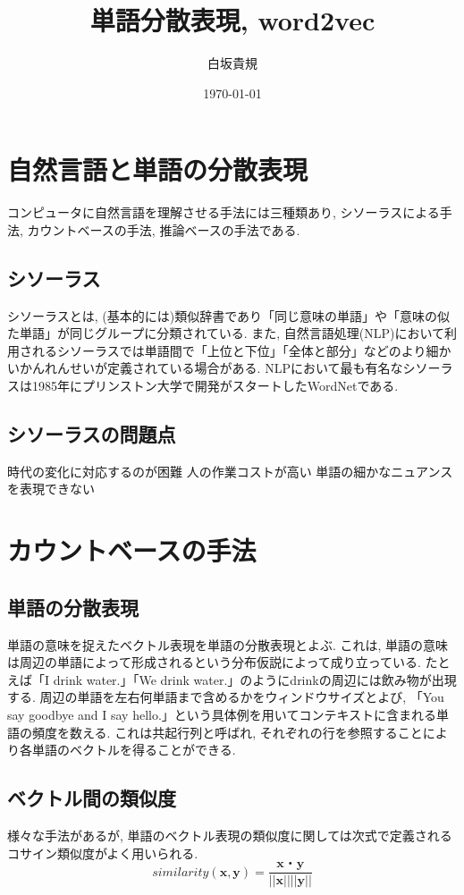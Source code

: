 \documentclass[twocolumn]{jarticle}
\title{単語分散表現, word2vec}
\author{白坂貴規}
\date{\today}
\begin{document}
\maketitle

\section{自然言語と単語の分散表現}
コンピュータに自然言語を理解させる手法には三種類あり, シソーラスによる手法, カウントベースの手法, 推論ベースの手法である.

\subsection{シソーラス}
シソーラスとは, (基本的には)類似辞書であり「同じ意味の単語」や「意味の似た単語」が同じグループに分類されている. また, 自然言語処理(NLP)において利用されるシソーラスでは単語間で「上位と下位」「全体と部分」などのより細かいかんれんせいが定義されている場合がある. NLPにおいて最も有名なシソーラスは1985年にプリンストン大学で開発がスタートしたWordNetである.

\subsection{シソーラスの問題点}
時代の変化に対応するのが困難
人の作業コストが高い
単語の細かなニュアンスを表現できない

\section{カウントベースの手法}

\subsection{単語の分散表現}
単語の意味を捉えたベクトル表現を単語の分散表現とよぶ. これは, 単語の意味は周辺の単語によって形成されるという分布仮説によって成り立っている. たとえば「I drink water.」「We drink water.」のようにdrinkの周辺には飲み物が出現する. 周辺の単語を左右何単語まで含めるかをウィンドウサイズとよび, 「You say goodbye and I say hello.」という具体例を用いてコンテキストに含まれる単語の頻度を数える.
これは共起行列と呼ばれ, それぞれの行を参照することにより各単語のベクトルを得ることができる.

\subsection{ベクトル間の類似度}
様々な手法があるが, 単語のベクトル表現の類似度に関しては次式で定義されるコサイン類似度がよく用いられる.
\begin{equation}
  similarity({\bm {x}}, {\bm {y}}) = \frac{{\bm {x}}・{\bm {y}}}{||{\bm x}|| ||{\bm y}||}
\end{equation}
\end{document}
